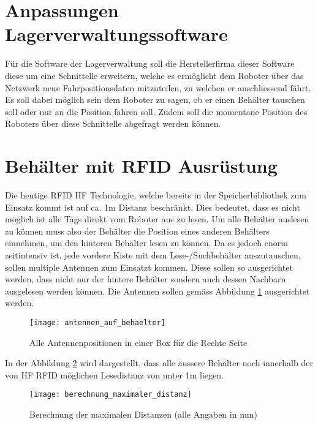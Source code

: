 \section{Anpassungen Lagerverwaltungssoftware}
\label{sec:roboterSWAnpassung}
Für die Software der Lagerverwaltung soll die Herstellerfirma dieser Software diese um eine Schnittelle erweitern, welche es ermöglicht dem Roboter über das Netzwerk neue Fahrpositionsdaten mitzuteilen, zu welchen er anschliessend fährt. Es soll dabei möglich sein dem Roboter zu sagen, ob er einen Behälter tauschen soll oder nur an die Position fahren soll. Zudem soll die momentane Position des Roboters über diese Schnittelle abgefragt werden können. 

\section{Behälter mit RFID Ausrüstung}
\label{sec:behaelterMitRFID}
Die heutige RFID HF Technologie, welche bereits in der Speicherbibliothek zum Einsatz kommt ist auf ca. 1m Distanz beschränkt. Dies bedeutet, dass es nicht möglich ist alle Tags direkt vom Roboter aus zu lesen. Um alle Behälter auslesen zu können muss also der Behälter die Position eines anderen Behälters einnehmen, um den hinteren Behälter lesen zu können. Da es jedoch enorm zeitintensiv ist, jede vordere Kiste mit dem Lese-/Suchbehälter auszutauschen, sollen multiple Antennen zum Einsatzt kommen. Diese sollen so ausgerichtet werden, dass nicht nur der hintere Behälter sondern auch dessen Nachbarn ausgelesen werden können.
Die Antennen sollen gemäss Abbildung \ref{fig:antennenPositionen} ausgerichtet werden.

\begin{figure}
	\centering
	\texttt{[image: antennen\_auf\_behaelter]}
	\caption{Alle Antennenpositionen in einer Box für die Rechte Seite}
	\label{fig:antennenPositionen}
\end{figure}

In der Abbildung \ref{fig:distanzcalc} wird dargestellt, dass alle äussere Behälter noch innerhalb der von HF RFID möglichen Lesedistanz von unter 1m liegen.

\begin{figure}
	\centering
	\texttt{[image: berechnung\_maximaler\_distanz]}
	\caption{Berechnung der maximalen Distanzen (alle Angaben in mm)}
	\label{fig:distanzcalc}
\end{figure}

